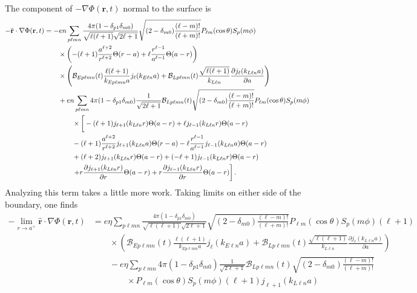 \documentclass{article}
\begin{document}
The component of $-\nabla\Phi(\mathbf{r},t)$ normal to the surface is
\begin{equation}
\begin{split}
-\hat{\mathbf{r}}\cdot\nabla\Phi(\mathbf{r},t) &= -en\sum_{p\ell mn}\frac{4\pi(1 - \delta_{p1}\delta_{m0})}{\sqrt{\ell(\ell + 1)}\sqrt{2\ell + 1}}\sqrt{(2 - \delta_{m0})\frac{(\ell - m)!}{(\ell + m)!}}P_{\ell m}(\cos\theta)S_p(m\phi)\\
&\qquad\times\left(-(\ell + 1)\frac{a^{\ell + 2}}{r^{\ell + 2}}\Theta(r - a) + \ell\frac{r^{\ell - 1}}{a^{\ell - 1}}\Theta(a - r)\right)\\
&\qquad\times\left(\mathcal{B}_{Ep\ell mn}(t)\frac{\ell(\ell + 1)}{k_{Ep\ell mn}a}j_\ell(k_{E\ell n}a) + \mathcal{B}_{Lp\ell mn}(t)\frac{\sqrt{\ell(\ell + 1)}}{k_{L\ell n}}\frac{\partial j_{\ell}(k_{L\ell n}a)}{\partial a}\right)\\
&\qquad + en\sum_{p\ell mn}4\pi(1 - \delta_{p1}\delta_{m0})\frac{1}{\sqrt{2\ell + 1}}\mathcal{B}_{Lp\ell mn}(t)\sqrt{(2 - \delta_{m0})\frac{(\ell - m)!}{(\ell + m)!}}P_{\ell m}(\cos\theta)S_p(m\phi)\\
&\qquad\qquad\times\left[ \vphantom{\frac{\partial}{\partial r}} -(\ell + 1)j_{\ell + 1}(k_{L\ell n}r)\Theta(a - r) + \ell j_{\ell - 1}(k_{L\ell n}r)\Theta(a - r)\right.\\
&\qquad\qquad - (\ell + 1)\frac{a^{\ell + 2}}{r^{\ell + 2}}j_{\ell + 1}(k_{L\ell n}a)\Theta(r - a) - \ell\frac{r^{\ell - 1}}{a^{\ell - 1}}j_{\ell - 1}(k_{L\ell n}a)\Theta(a - r)\\
&\qquad\qquad + (\ell + 2)j_{\ell + 1}(k_{L\ell n}r)\Theta(a - r) + (-\ell + 1)j_{\ell - 1}(k_{L\ell n}r)\Theta(a - r)\\
&\qquad\qquad\left. + r\frac{\partial j_{\ell + 1}(k_{L\ell n}r)}{\partial r}\Theta(a - r) + r\frac{\partial j_{\ell - 1}(k_{L\ell n}r)}{\partial r}\Theta(a - r)\right].
\end{split}
\end{equation}
Analyzing this term takes a little more work. Taking limits on either side of the boundary, one finds
\begin{equation}
\begin{split}
-\lim_{r\to a^+}\hat{\mathbf{r}}\cdot\nabla\Phi(\mathbf{r},t) &= e\eta\sum_{p\ell mn}\frac{4\pi(1 - \delta_{p1}\delta_{m0})}{\sqrt{\ell(\ell + 1)}\sqrt{2\ell + 1}}\sqrt{(2 - \delta_{m0})\frac{(\ell - m)!}{(\ell + m)!}}P_{\ell m}(\cos\theta)S_p(m\phi)(\ell + 1)\\
&\qquad\times\left(\mathcal{B}_{Ep\ell mn}(t)\frac{\ell(\ell + 1)}{k_{Ep\ell mn}a}j_\ell(k_{E\ell n}a) + \mathcal{B}_{Lp\ell mn}(t)\frac{\sqrt{\ell(\ell + 1)}}{k_{L\ell n}}\frac{\partial j_{\ell}(k_{L\ell n}a)}{\partial a}\right)\\
&\qquad - e\eta\sum_{p\ell mn}4\pi(1 - \delta_{p1}\delta_{m0})\frac{1}{\sqrt{2\ell + 1}}\mathcal{B}_{Lp\ell mn}(t)\sqrt{(2 - \delta_{m0})\frac{(\ell - m)!}{(\ell + m)!}}\\
&\qquad\qquad\times P_{\ell m}(\cos\theta)S_p(m\phi)(\ell + 1)j_{\ell + 1}(k_{L\ell n}a)
\end{split}
\end{equation}
\end{document}
